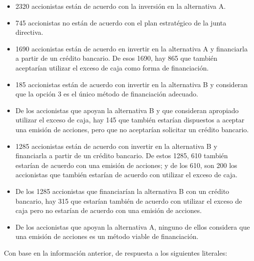 \documentclass[11pt, spanish]{article}
\begin{document}
\begin{itemize}
\item 2320 accionistas están de acuerdo con la inversión en la alternativa A.
\item 745 accionistas no están de acuerdo con el plan estratégico de la junta directiva.
\item 1690 accionistas están de acuerdo en invertir en la alternativa A y financiarla a partir de un crédito bancario. De esos 1690, hay 865 que también aceptarían utilizar el exceso de caja
como forma de financiación.
\item 185 accionistas están de acuerdo con invertir en la alternativa B y consideran que la opción 3 es el único método de financiación adecuado.
\item De los accionistas que apoyan la alternativa B y que consideran apropiado utilizar el exceso
de caja, hay 145 que también estarían dispuestos a aceptar una emisión de acciones, pero
que no aceptarían solicitar un crédito bancario.
\item 1285 accionistas están de acuerdo con invertir en la alternativa B y financiarla a partir de un
crédito bancario. De estos 1285, 610 también estarían de acuerdo con una emisión de acciones; y de los 610, son 200 los accionistas que también estarían de acuerdo con utilizar el exceso de caja.
\item De los 1285 accionistas que financiarían la alternativa B con un crédito bancario, hay 315 que estarían también de acuerdo con utilizar el exceso de caja pero no estarían de acuerdo con una emisión de acciones.
\item De los accionistas que apoyan la alternativa A, ninguno de ellos considera que una emisión de acciones es un método viable de financiación.

\end{itemize}

Con base en la información anterior, de respuesta a los siguientes literales:
\end{document}
